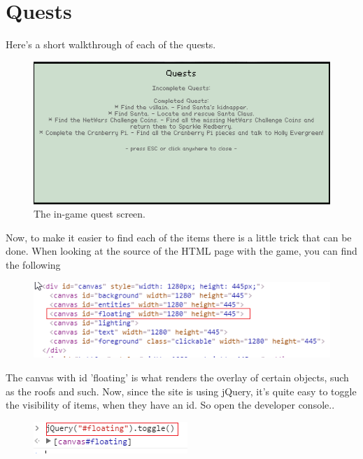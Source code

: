 \documentclass[writeup.tex]{subfiles}
\begin{document}
			
	
\section{Quests} \label{section.quests}
	Here's a short walkthrough of each of the quests.

	\begin{figure}[H]
		\centering
		\includegraphics[width=.9\linewidth]{screenshots/quests}
		\caption{The in-game quest screen.}
	\end{figure}
	
	Now, to make it easier to find each of the items there is a little trick that can be done. When looking at the source of the HTML page with the game, you can find the following
	
	\begin{figure}[H]
		\centering
		\includegraphics[scale=1]{"screenshots/canvas html"}
	\end{figure}
	
	The canvas with id 'floating' is what renders the overlay of certain objects, such as the roofs and such. Now, since the site is using jQuery, it's quite easy to toggle the visibility of items, when they have an id. So open the developer console..
	
	\begin{figure}[H]
		\centering
		\includegraphics[scale=1]{"screenshots/coins"}
	\end{figure}
	
\end{document}
